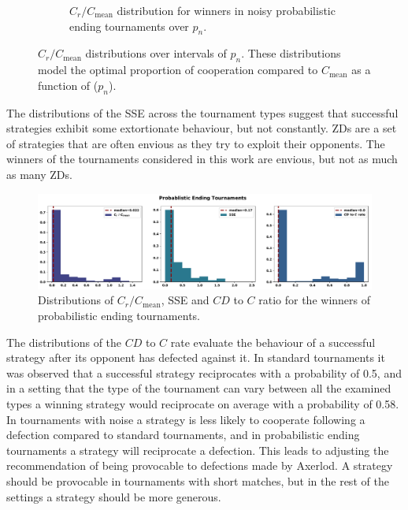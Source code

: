 \begin{figure}[!htbp]
\begin{subfigure}{0.485\textwidth}
        \caption{\(C_r / C_{\text{mean}}\) distribution for winners in noisy probabilistic ending tournaments over
        \(p_n\).}\label{fig:noisy_probend_discussion_over_noise}
    \end{subfigure}
    \caption{\(C_r / C_{\text{mean}}\) distributions over intervals of \(p_n\).
    These distributions model the optimal proportion of cooperation
    compared to \(C_{\text{mean}}\) as a function of (\(p_n\)).}
    \label{fig:compared_to_mean_over_noise_probability}
\end{figure}

The distributions of the SSE across the tournament types suggest that successful
strategies exhibit some extortionate behaviour, but not constantly.
ZDs are a set of strategies that are often envious as they try to exploit their
opponents. The winners of the tournaments considered in this work are
envious, but not as much as many ZDs.

\begin{figure}[!htbp]
    \centering
        \centering
        \includegraphics[width=\textwidth]{../images/probend_discussion.pdf}
        \caption{Distributions of \(C_r / C_{\text{mean}}\), SSE and \(CD\) to \(C\) ratio
        for the winners of probabilistic ending tournaments.}
        \label{fig:discussion_probend}
\end{figure}

The distributions of the \(CD\) to \(C\) rate evaluate the behaviour of a
successful strategy after its opponent has defected against it. In standard
tournaments it was observed that a successful strategy reciprocates with a
probability of 0.5, and in a setting that the type
of the tournament can vary between all the examined types a winning strategy
would reciprocate on average with a probability of 0.58. In
tournaments with noise a strategy is less likely to cooperate following a
defection compared to standard tournaments, and in probabilistic ending
tournaments a strategy will reciprocate a defection.
This leads to adjusting the recommendation of being provocable to defections made
by Axerlod. A strategy should be provocable in tournaments with short matches,
but in the rest of the settings a strategy should be more generous.

